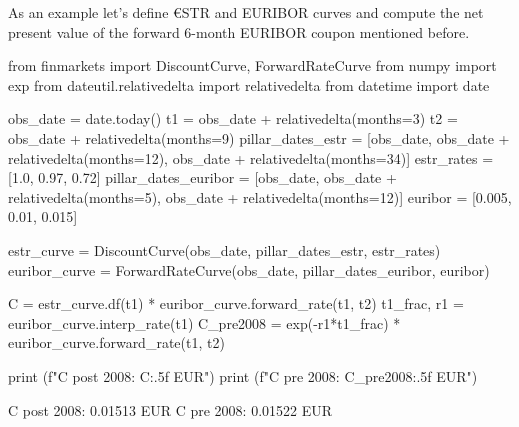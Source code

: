 %
%

As an example let's define \euro STR and EURIBOR curves and compute the net present value of the forward 6-month EURIBOR coupon mentioned before.

\begin{ipython}
from finmarkets import DiscountCurve, ForwardRateCurve
from numpy import exp
from dateutil.relativedelta import relativedelta
from datetime import date

obs_date = date.today()
t1 = obs_date + relativedelta(months=3)
t2 = obs_date + relativedelta(months=9)
pillar_dates_estr = [obs_date, 
                     obs_date + relativedelta(months=12),
                     obs_date + relativedelta(months=34)]
estr_rates = [1.0, 0.97, 0.72]
pillar_dates_euribor = [obs_date, 
                        obs_date + relativedelta(months=5), 
                        obs_date + relativedelta(months=12)]
euribor = [0.005, 0.01, 0.015]

estr_curve = DiscountCurve(obs_date, pillar_dates_estr, estr_rates) 
euribor_curve = ForwardRateCurve(obs_date, pillar_dates_euribor, euribor) 

C = estr_curve.df(t1) * euribor_curve.forward_rate(t1, t2)
t1_frac, r1 = euribor_curve.interp_rate(t1)
C_pre2008 = exp(-r1*t1_frac) * euribor_curve.forward_rate(t1, t2)

print (f"C post 2008: {C:.5f} EUR")
print (f"C pre 2008: {C_pre2008:.5f} EUR")
\end{ipython}
\begin{ioutput}
C post 2008: 0.01513 EUR
C pre 2008: 0.01522 EUR
\end{ioutput}


